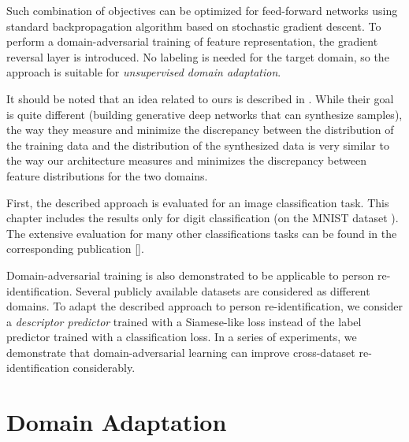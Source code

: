 Such combination of objectives can be optimized for feed-forward networks using standard backpropagation algorithm based on stochastic gradient descent. To perform a domain-adversarial training of feature representation, the gradient reversal layer is introduced. No labeling is needed for the target domain, so the approach is suitable for \textit{unsupervised domain adaptation}.

It should be noted that an idea related to ours is described in \citep{Goodfellow14}. While their goal is quite different (building generative deep networks that can synthesize samples), the way they measure and minimize the discrepancy between the distribution of the training data and the distribution of the synthesized data is very similar to the way our architecture measures and minimizes the discrepancy between feature distributions for the two domains. %

First, the described approach is evaluated for an image classification task. This chapter includes the results only for digit classification (on the MNIST dataset \citep{LeCun98}). The extensive evaluation for many other classifications tasks can be found in the corresponding publication [\cite{ganin2016domain}].

Domain-adversarial training is also demonstrated to be applicable to person re-identification. Several publicly available datasets are considered as different domains. 
To adapt the described approach to person re-identification, we consider a \textit{descriptor predictor} trained with a Siamese-like loss instead of the label predictor trained with a classification loss. In a series of experiments, we demonstrate that domain-adversarial learning can improve cross-dataset re-identification considerably. 






\section{Domain Adaptation}
\label{section:DA_theory}

